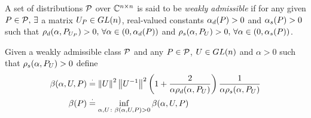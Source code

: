 \documentclass{article}
\begin{document}
\begin{definition}
A set of distributions $\P$ over $\C^{\ncn}$ is said to be \emph{weakly admissible} if for any given $P\in \P,\,\exists$ a matrix $U_P \in \gln$, real-valued constants $\alphapd>0$ and $\alphaps>0$ such that $\rhod{P_{U_P}}>0,\,\forall \alpha\in(0,\alphapd)$ and $\rhos{P_U}>0,\,\forall \alpha\in(0,\alphaps)$.
\end{definition}
\begin{definition}
Given a weakly admissible class $\P$ and any $P\in\P$, $U\in \gln$ and $\alpha>0$ such that $\rhos{P_{U}}>0$ define
\begin{align*}
\bu&\eqdef \norm{U}^2\norm{U^{-1}}^2 \left(1+\frac2{\alpha\rhod{P_U}}\right)\frac{1}{\alpha \rhos{P_U}}\\
\beta(P)&\eqdef \inf_{\alpha,U\colon \bu>0} \bu
\end{align*}
\end{definition}
\end{document}
